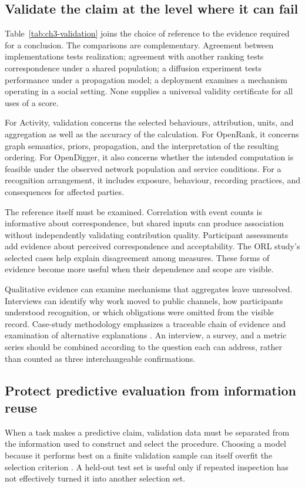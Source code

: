 \subsection{Validate the claim at the level where it can fail}
Table~\ref{tab:ch3-validation} joins the choice of reference to the evidence required for a conclusion. The comparisons are complementary. Agreement between implementations tests realization; agreement with another ranking tests correspondence under a shared population; a diffusion experiment tests performance under a propagation model; a deployment examines a mechanism operating in a social setting. None supplies a universal validity certificate for all uses of a score.



For Activity, validation concerns the selected behaviours, attribution, units, and aggregation as well as the accuracy of the calculation. For OpenRank, it concerns graph semantics, priors, propagation, and the interpretation of the resulting ordering. For OpenDigger, it also concerns whether the intended computation is feasible under the observed network population and service conditions. For a recognition arrangement, it includes exposure, behaviour, recording practices, and consequences for affected parties.

The reference itself must be examined. Correlation with event counts is informative about correspondence, but shared inputs can produce association without independently validating contribution quality. Participant assessments add evidence about perceived correspondence and acceptability. The ORL study's selected cases help explain disagreement among measures. These forms of evidence become more useful when their dependence and scope are visible.

Qualitative evidence can examine mechanisms that aggregates leave unresolved. Interviews can identify why work moved to public channels, how participants understood recognition, or which obligations were omitted from the visible record. Case-study methodology emphasizes a traceable chain of evidence and examination of alternative explanations \citep{runeson2009}. An interview, a survey, and a metric series should be combined according to the question each can address, rather than counted as three interchangeable confirmations.

\subsection{Protect predictive evaluation from information reuse}
When a task makes a predictive claim, validation data must be separated from the information used to construct and select the procedure. Choosing a model because it performs best on a finite validation sample can itself overfit the selection criterion \citep{cawley2010}. A held-out test set is useful only if repeated inspection has not effectively turned it into another selection set.

